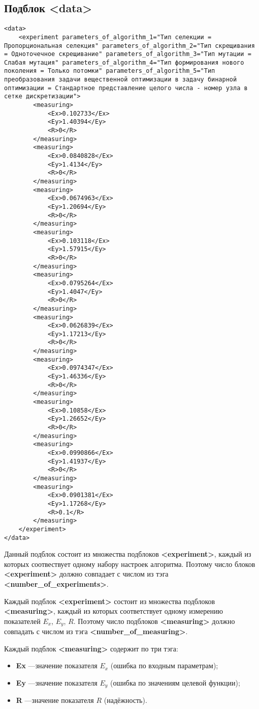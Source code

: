 \documentclass[a4paper,12pt]{article}
\begin{document}
\subsection{Подблок <data>}

\begin{lstlisting}[label=Part10,caption=Подблок в файле Harrix Optimization Testing]
<data>
	<experiment parameters_of_algorithm_1="Тип селекции = Пропорциональная селекция" parameters_of_algorithm_2="Тип скрещивания = Одноточечное скрещивание" parameters_of_algorithm_3="Тип мутации = Слабая мутация" parameters_of_algorithm_4="Тип формирования нового поколения = Только потомки" parameters_of_algorithm_5="Тип преобразования задачи вещественной оптимизации в задачу бинарной оптимизации = Стандартное представление целого числа - номер узла в сетке дискретизации">
		<measuring>
			<Ex>0.102733</Ex>
			<Ey>1.40394</Ey>
			<R>0</R>
		</measuring>
		<measuring>
			<Ex>0.0840828</Ex>
			<Ey>1.4134</Ey>
			<R>0</R>
		</measuring>
		<measuring>
			<Ex>0.0674963</Ex>
			<Ey>1.20694</Ey>
			<R>0</R>
		</measuring>
		<measuring>
			<Ex>0.103118</Ex>
			<Ey>1.57915</Ey>
			<R>0</R>
		</measuring>
		<measuring>
			<Ex>0.0795264</Ex>
			<Ey>1.4047</Ey>
			<R>0</R>
		</measuring>
		<measuring>
			<Ex>0.0626839</Ex>
			<Ey>1.17213</Ey>
			<R>0</R>
		</measuring>
		<measuring>
			<Ex>0.0974347</Ex>
			<Ey>1.46336</Ey>
			<R>0</R>
		</measuring>
		<measuring>
			<Ex>0.10858</Ex>
			<Ey>1.26652</Ey>
			<R>0</R>
		</measuring>
		<measuring>
			<Ex>0.0990866</Ex>
			<Ey>1.41937</Ey>
			<R>0</R>
		</measuring>
		<measuring>
			<Ex>0.0901381</Ex>
			<Ey>1.17268</Ey>
			<R>0.1</R>
		</measuring>
	</experiment>
</data>
\end{lstlisting}

Данный подблок состоит из множества подблоков \textbf{<experiment>}, каждый из которых соотвествует одному набору настроек алгоритма. Поэтому число блоков \textbf{<experiment>} должно совпадает с числом из тэга \textbf{<number\_of\_experiments>}.

Каждый подблок \textbf{<experiment>} состоит из множества подблоков \textbf{<measuring>}, каждый из которых соответствует одному измерению показателей $ E_x $, $ E_y $, $ R $. Поэтому число подблоков \textbf{<measuring>} должно совпадать с числом из тэга  \textbf{<number\_of\_measuring>}.

Каждый подблок \textbf{<measuring>} содержит по три тэга:
\begin{itemize}
\item \textbf{Ex} ---значение показателя $ E_x $ (ошибка по входным параметрам);
\item \textbf{Ey} ---значение показателя $ E_y $ (ошибка по значениям целевой функции);
\item \textbf{R} ---значение показателя $ R $ (надёжность).
\end{itemize} 
\end{document}
